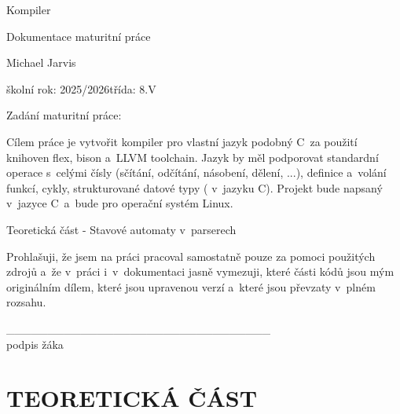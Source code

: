 \documentclass[12pt]{article}
\newif\ifdoc\docfalse
\def\title{Kompiler}
\def\author{Michael Jarvis}
\def\year{2025/2026}
\def\class{8.V}
\begin{document}
\doctrue
\begin{titlepage}
	\vspace*{\fill}
	\centering
	{\Huge\title\par}
	\vspace{3\baselineskip}
	{\Large Dokumentace maturitní práce\par}
	\vspace{2\baselineskip}
	{\Large\author\par}
	\vfill\vfill
	{\large školní rok: \year}\hfil{\large třída: \class}
	\vspace*{3cm}
\end{titlepage}

	{\Large Zadání maturitní práce:\par}
	Cílem práce je vytvořit kompiler pro vlastní jazyk podobný C~za použití knihoven flex, bison a~LLVM toolchain.
	Jazyk by měl podporovat standardní operace s~celými čísly (sčítání, odčítání, násobení, dělení, ...), definice a~volání funkcí, cykly, strukturované datové typy ( v~jazyku C).
	Projekt bude napsaný v~jazyce C~a~bude pro operační systém Linux.

	Teoretická část - Stavové automaty v~parserech
\restoregeometry

\newpage
\vspace*{\fill}
\begin{center}
Prohlašuji, že jsem na práci pracoval samostatně pouze za pomoci použitých zdrojů a~že
v~práci i~v~dokumentaci jasně vymezuji, které části kódů jsou mým originálním dílem, které
jsou upravenou verzí a které jsou převzaty v plném rozsahu.
\end{center}
\vspace{2cm}
\begin{flushright}
\_\_\_\_\_\_\_\_\_\_\_\_\_\_\_\_\_\_\_\_\_\_\_\_\_\_\_\_\_\_\_\_
\vspace{5pt}\\
podpis žáka \hspace*{4cm}
\end{flushright}
\vspace*{\fill}

\newpage
\renewcommand\contentsname{Obsah}
\renewcommand\cftsecaftersnum{.}
\renewcommand\cftsubsecaftersnum{.}
\renewcommand\cftsubsubsecaftersnum{.}
\renewcommand\cftsecleader{\cftdotfill{\cftdotsep}}
\tableofcontents






\newpage
\section{TEORETICKÁ ČÁST}
\end{document}
